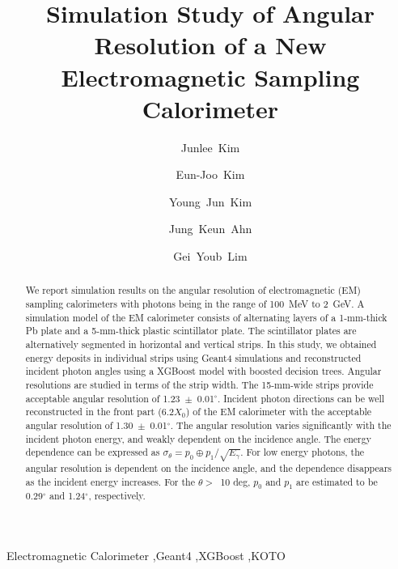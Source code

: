 \documentclass[preprint,12pt,times,a4paper]{elsarticle}
\begin{document}
\begin{frontmatter}

\setcounter{page}{0}
\title{Simulation Study of Angular Resolution of a New Electromagnetic Sampling Calorimeter}

\author[jbnu]{Junlee~Kim}

\author[jbnu]{Eun-Joo~Kim}

\author[korea]{Young~Jun~Kim}
\author[korea]{Jung~Keun~Ahn}
\author[kek]{Gei~Youb~Lim}

\address[jbnu]{Division of Science Education, Jeonbuk National University, Jeonju 54896, Korea}
\address[korea]{Department of Physics, Korea University, Seoul 02841, Korea}
\address[kek]{Institute of Particle and Nuclear Studies (IPNS), High Energy Accelerator Research Organization (KEK), Tsukuba 305-0801, Japan}


\begin{abstract}
We report simulation results on the angular resolution of electromagnetic (EM) sampling calorimeters with photons being in the range of 100~MeV to 2~GeV. A simulation model of the EM calorimeter consists of alternating layers of a 1-mm-thick Pb plate and a 5-mm-thick plastic scintillator plate. The scintillator plates are alternatively segmented in horizontal and vertical strips. In this study, we obtained energy deposits in individual strips using Geant4 simulations and reconstructed incident photon angles using a XGBoost model with boosted decision trees. Angular resolutions are studied in terms of the strip width.
The 15-mm-wide strips provide acceptable angular resolution of 1.23~$\pm$~0.01$^{\circ}$. Incident photon directions can be well reconstructed in the front part (6.2$X_{0}$) of the EM calorimeter with the acceptable angular resolution of 
1.30~$\pm$~0.01$^{\circ}$. The angular resolution varies significantly with the incident photon energy, and weakly dependent on the incidence angle. The energy dependence can be expressed as $\sigma_{\theta}= p_{0} \oplus p_{1} /\sqrt{E_{\gamma}}$. For low energy photons, the angular resolution is dependent on the incidence angle, and the dependence disappears as the incident energy increases. For the $\theta>$~10 deg, $p_{0}$ and $p_{1}$ are estimated to be 0.29$^{\circ}$ and 1.24$^{\circ}$, respectively.

\end{abstract}
\begin{keyword}
Electromagnetic Calorimeter \sep Geant4 \sep XGBoost \sep KOTO
\end{keyword}

\end{frontmatter}
\end{document}
